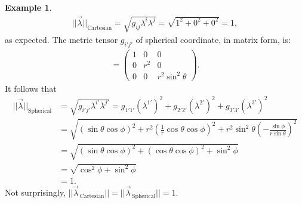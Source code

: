 \documentclass{book}
\theoremstyle{definition}
\newtheorem{exmp}{Example}[section]
\begin{document}
\begin{exmp}
	\begin{align*}
	\vert\vert \vec{\lambda} \vert\vert_{\text{Cartesian}} = \sqrt{g_{ij}\lambda^i\lambda^j} = \sqrt{1^2 + 0^2 + 0^2} = 1,
	\end{align*}
	as expected. The metric tensor $g_{i'j'}$ of spherical coordinate, in matrix form, is:
	\begin{align*}
	[g_{i'j'}] = \begin{pmatrix}
	1 & 0 & 0\\
	0 & r^2 & 0\\
	0 & 0 & r^2\sin^2\theta
	\end{pmatrix}.
	\end{align*}
	It follows that
	\begin{align*}
	\vert\vert \vec{\lambda} \vert\vert_{\text{Spherical}} &= \sqrt{g_{i'j'}\lambda^{i'}\lambda^{j'}} = g_{1'1'}\left( \lambda^{1'}\right) ^2 + g_{2'2'}\left( \lambda^{2'}\right) ^2 + g_{3'3'}\left( \lambda^{3'}\right) ^2\\
	&= \sqrt{\left( \sin\theta\cos\phi\right)^2 + r^2\left(\frac{1}{r}\cos\theta\cos\phi \right)^2 + r^2\sin^2\theta\left(-\frac{\sin\phi}{r\sin\theta} \right)^2  }\\
	&= \sqrt{\left( \sin\theta\cos\phi\right)^2 + \left(\cos\theta\cos\phi \right)^2 + \sin^2\phi}\\
	&= \sqrt{\cos^2\phi + \sin^2\phi}\\
	&= 1.
	\end{align*}
	Not surprisingly, $\vert\vert \vec{\lambda}_{\,\text{Cartesian}} \vert\vert = \vert\vert \vec{\lambda}_{\,\text{Spherical}} \vert\vert = 1$.
\end{exmp}
\end{document}
